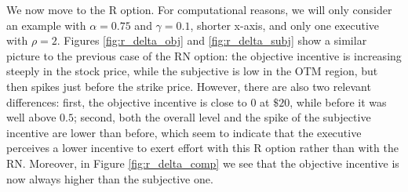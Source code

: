 We now move to the R option. For computational reasons, we will only consider an example with $\alpha = 0.75$ and $\gamma = 0.1$, shorter x-axis, and only one executive with $\rho = 2$. Figures \ref*{fig:r_delta_obj} and \ref*{fig:r_delta_subj} show a similar picture to the previous case of the RN option: the objective incentive is increasing steeply in the stock price, while the subjective is low in the OTM region, but then spikes just before the strike price. However, there are also two relevant differences: first, the objective incentive is close to 0 at $\$20$, while before it was well above $0.5$; second, both the overall level and the spike of the subjective incentive are lower than before, which seem to indicate that the executive perceives a lower incentive to exert effort with this R option rather than with the RN. Moreover, in Figure \ref*{fig:r_delta_comp} we see that the objective incentive is now always higher than the subjective one.

